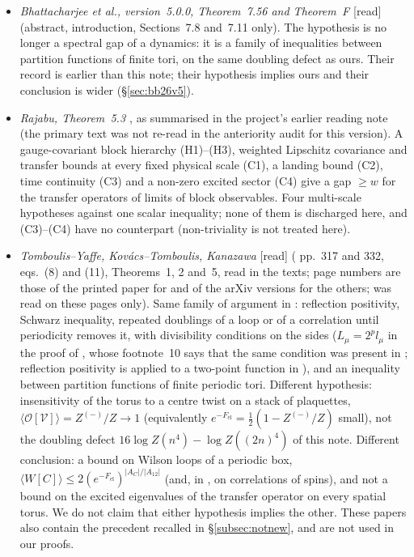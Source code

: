\documentclass[11pt,a4paper]{article}
\theoremstyle{plain}
\theoremstyle{definition}
\theoremstyle{remark}
\numberwithin{equation}{section}
\newcommand{\st}[1]{\textsf{[#1]}}
\begin{document}
\begin{itemize}
imply the other.
\item \emph{Bhattacharjee et al., version~5.0.0, Theorem~7.56 and Theorem~F \cite{BB26v5}} \st{read} (abstract, introduction, Sections~7.8
and~7.11 only). The hypothesis is no longer a spectral gap of a dynamics: it is a family of inequalities between partition functions of
finite tori, on the same doubling defect as ours. Their record is earlier than this note; their hypothesis implies ours and their conclusion
is wider (\S\ref{sec:bb26v5}).
\item \emph{Rajabu, Theorem~5.3 \cite{Raj26}}, as summarised in the project's earlier reading note (the primary text was not re-read in the anteriority audit for this version). A gauge-covariant block hierarchy (H1)--(H3), weighted Lipschitz covariance and
transfer bounds at every fixed physical scale (C1), a landing bound (C2), time continuity (C3) and a non-zero excited sector (C4) give a
gap $\ge w$ for the transfer operators of limits of block observables. Four multi-scale hypotheses against one scalar inequality; none of
them is discharged here, and (C3)--(C4) have no counterpart (non-triviality is not treated here).
\item \emph{Tomboulis--Yaffe, Kov\'acs--Tomboulis, Kanazawa} \cite{TY85,KT02,Kan} \st{read} (\cite{TY85} pp.~317 and 332, \cite{KT02} eqs.~(8) and (11), \cite{Kan} Theorems~1, 2 and~5, read in the texts; page numbers are those of the printed paper for \cite{TY85} and of the arXiv versions for the others; \cite{TY85} was read on these pages only). Same family of argument in \cite{KT02,Kan}: reflection positivity, Schwarz inequality, repeated doublings of a loop or of a correlation until periodicity removes it, with divisibility conditions on the sides ($L_\mu=2^pl_\mu$ in the proof of \cite[Theorem~2, p.~9]{Kan}, whose footnote~10 says that the same condition was present in \cite{TY85}; reflection positivity is applied to a two-point function in \cite[p.~332]{TY85}), and an inequality between partition functions of finite periodic tori. Different hypothesis: insensitivity of the torus to a centre twist on a stack of plaquettes, $\langle\mathcal O[\mathcal V]\rangle=Z^{(-)}/Z\to1$ (equivalently $e^{-F_{\mathrm{el}}}=\frac12(1-Z^{(-)}/Z)$ small), not the doubling defect $16\log Z(n^4)-\log Z((2n)^4)$ of this note. Different conclusion: a bound on Wilson loops of a periodic box, $\langle W[C]\rangle\le2(e^{-F_{\mathrm{el}}})^{|A_C|/|A_{12}|}$ (and, in \cite{Kan}, on correlations of spins), and not a bound on the excited eigenvalues of the transfer operator on every spatial torus. We do not claim that either hypothesis implies the other. These papers also contain the precedent recalled in \S\ref{subsec:notnew}, and are not used in our proofs.

\end{itemize}
\end{document}
